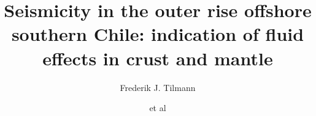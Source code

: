 \documentclass[reviewcopy]{elsart}
\begin{document}
\begin{frontmatter}



\title{Seismicity in the outer rise offshore southern Chile:
  indication of fluid effects in crust and mantle}


\author[cam]{Frederik J. Tilmann}
\author[ifm,ham]{et al}

\address[cam]{Bullard Laboratories, University of Cambridge,
  Cambridge CB3 0EZ, UK}
\address[ifm]{IfM-GEOMAR, Kiel, Germany}
\address[ham]{Institute for Geophysics, University of Hamburg, Hamburg, Germany}

\begin{abstract}



\end{abstract}
\end{frontmatter}
\end{document}
